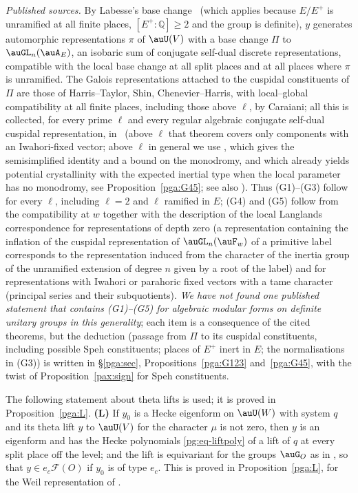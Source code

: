 \documentclass[10pt]{amsart}
\theoremstyle{definition}
\theoremstyle{remark}
\newcommand{\Q}{\mathbb Q}
\begin{document}
\emph{Published sources.} By Labesse's base change~\cite{Labesse} (which applies because $E/E^+$
is unramified at all finite places, $[E^+:\Q]\ge2$ and the group is definite), $y$ generates
automorphic representations $\pi$ of $\auU(V)$ with a base change $\Pi$ to $\auGL_n(\auA_E)$, an
isobaric sum of conjugate self-dual discrete representations, compatible with the local base
change at all split places and at all places where $\pi$ is unramified. The Galois
representations attached to the cuspidal constituents of $\Pi$ are those of Harris--Taylor, Shin,
Chenevier--Harris, with local--global compatibility at all finite places, including those above
$\ell$, by Caraiani; all this is collected, for every prime $\ell$ and every regular algebraic
conjugate self-dual cuspidal representation, in~\cite[Theorem~2.1.1]{BLGGT} (above $\ell$ that
theorem covers only components with an Iwahori-fixed vector; above $\ell$ in general we use
\cite[Theorem~A]{BLGGTlp2}, which gives the semisimplified identity and a bound on the monodromy,
and which already yields potential crystallinity with the expected inertial type when the
local parameter has no monodromy, see Proposition~\ref{pga:G45}; see also
\cite{BLGGTlp1,CaraianiANT}). Thus (G1)--(G3)
follow for every $\ell$, including $\ell=2$ and $\ell$ ramified in $E$; (G4) and (G5) follow from
the compatibility at $w$ together with the description of the local Langlands correspondence for
representations of depth zero (a representation containing the inflation of the cuspidal
representation of $\auGL_n(\auF_w)$ of a primitive label corresponds to the representation induced
from the character of the inertia group of the unramified extension of degree $n$ given by a root
of the label) and for representations with Iwahori or parahoric fixed vectors with a tame
character (principal series and their subquotients). \emph{We have not found one published
statement that contains {\rm(G1)--(G5)} for algebraic modular forms on definite unitary groups in
this generality}; each item is a consequence of the cited theorems, but the deduction (passage
from $\Pi$ to its cuspidal constituents, including possible Speh constituents; places of $E^+$
inert in $E$; the normalisations in (G3)) is written in \S\ref{pga:sec}, Propositions~\ref{pga:G123} and~\ref{pga:G45}, with
the twist of Proposition~\ref{pax:sign} for Speh constituents.



\smallskip
The following statement about theta lifts is used; it is proved in Proposition~\ref{pga:L}.
\smallskip\noindent\textbf{(L)} If $y_0$ is a Hecke
eigenform on $\auU(W)$ with system $q$ and its theta lift $y$ to $\auU(V)$ for the character $\mu$
is not zero, then $y$ is an eigenform and has the Hecke polynomials \eqref{pg:eq-liftpoly} of a
lift of $q$ at every split place off the level; and the lift is equivariant for the groups
$\auG_O$ as in {\cite[Proposition~14.27]{P46}}, so that $y\in e_c\mathcal F(O)$ if $y_0$ is of type
$e_c$. This is proved in Proposition~\ref{pga:L}, for the Weil representation of {\cite[\S2.1]{P54}}.\par\smallskip
\end{document}
